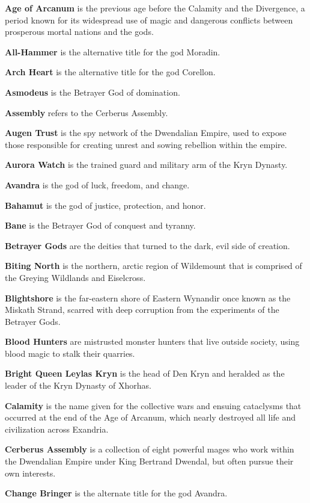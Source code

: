 \documentclass[10pt,a4paper,twoside,bg=print,twocolumn,openany,nodeprecatedcode]{dndbook}
\begin{document}
\textbf{Age of Arcanum} is the previous age before the Calamity and the Divergence, a period known for its widespread use of magic and dangerous conflicts between prosperous mortal nations and the gods.

\textbf{All-Hammer} is the alternative title for the god Moradin.

\textbf{Arch Heart} is the alternative title for the god Corellon.

\textbf{Asmodeus} is the Betrayer God of domination.

\textbf{Assembly} refers to the Cerberus Assembly.

\textbf{Augen Trust} is the spy network of the Dwendalian Empire, used to expose those responsible for creating unrest and sowing rebellion within the empire.

\textbf{Aurora Watch} is the trained guard and military arm of the Kryn Dynasty.

\textbf{Avandra} is the god of luck, freedom, and change.

\textbf{Bahamut} is the god of justice, protection, and honor.

\textbf{Bane} is the Betrayer God of conquest and tyranny.

\textbf{Betrayer Gods} are the deities that turned to the dark, evil side of creation.

\textbf{Biting North} is the northern, arctic region of Wildemount that is comprised of the Greying Wildlands and Eiselcross.

\textbf{Blightshore} is the far-eastern shore of Eastern Wynandir once known as the Miskath Strand, scarred with deep corruption from the experiments of the Betrayer Gods.

\textbf{Blood Hunters} are mistrusted monster hunters that live outside society, using blood magic to stalk their quarries.

\textbf{Bright Queen Leylas Kryn} is the head of Den Kryn and heralded as the leader of the Kryn Dynasty of Xhorhas.

\textbf{Calamity} is the name given for the collective wars and ensuing cataclysms that occurred at the end of the Age of Arcanum, which nearly destroyed all life and civilization across Exandria.

\textbf{Cerberus Assembly} is a collection of eight powerful mages who work within the Dwendalian Empire under King Bertrand Dwendal, but often pursue their own interests.

\textbf{Change Bringer} is the alternate title for the god Avandra.
\end{document}
